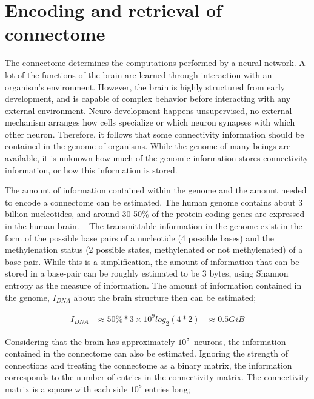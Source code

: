 \documentclass[../dissertation.tex]{subfiles}
\begin{document}
\myChapterCover{}

\section{Encoding and retrieval of connectome}
\label{sec:connclone}

The connectome determines the computations performed by a neural network.
A lot of the functions of the brain are learned through interaction with an organism's environment.
However, the brain is highly structured from early development, and is capable of complex behavior before interacting with any external environment.
Neuro-development happens unsupervised, no external mechanism arranges how cells specialize or which neuron synapses with which other neuron.
Therefore, it follows that some connectivity information should be contained in the genome of organisms.
While the genome of many beings are available, it is unknown how much of the genomic information stores connectivity information, or how this information is stored.

The amount of information contained within the genome and the amount needed to encode a connectome can be estimated.
The human genome contains about 3 billion nucleotides, and around 30-50\% of the protein coding genes are expressed in the human brain. ~\cite{FinishingEuchromaticSequence2004,ajSurveyGeneticHuman2007}
The transmittable information in the genome exist in the form of the possible base pairs of a nucleotide (4 possible bases) and the methylenation status (2 possible states, methylenated or not methylenated) of a base pair.
While this is a simplification, the amount of information that can be stored in a base-pair can be roughly estimated to be 3 bytes, using Shannon entropy as the measure of information.
The amount of information contained in the genome, $I_{DNA}$ about the brain structure then can be estimated;

\begin{align}
    \label{eqn:estimateDnaData}
    I_{DNA} & \approx 50\% * 3 \times 10^9 log_{2} \left( 4 * 2 \right)
            & \approx 0.5 GiB
\end{align}

Considering that the brain has approximately $10^{8}$~neurons, the information contained in the connectome can also be estimated.
Ignoring the strength of connections and treating the connectome as a binary matrix, the information corresponds to the number of entries in the connectivity matrix.
The connectivity matrix is a square with each side $10^{8}$ entries long;
\end{document}
